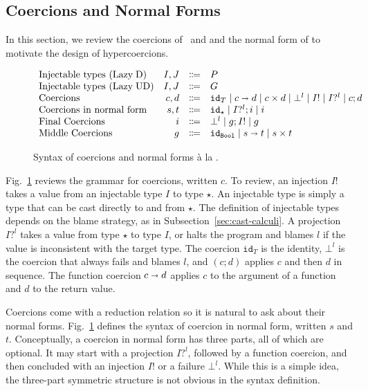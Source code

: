 \documentclass[runningheads]{llncs}
\newcommand{\stxrule}[3]{\text{#2} & #1 & \Coloneqq & #3\\}
\newcommand{\figref}[1]{Fig.~\ref{#1}}
\newcommand{\LUD}{\ensuremath{\text{Lazy\;UD}}}
\newcommand{\LD}{\ensuremath{\text{Lazy\;D}}}
\newcommand{\Tdyn}[0]{\ensuremath{\star}}
\newcommand{\Pbool}[0]{\ensuremath{\mathtt{Bool}}}
\newcommand{\Pfunc}[2]{\ensuremath{#1 \shortrightarrow #2}}
\newcommand{\Pprod}[2]{\ensuremath{#1 \times #2}}
\newcommand{\cnfproj}[2]{#1?^{#2}}
\newcommand{\cnfinj}[1]{#1!}
\newcommand{\cnfseq}[2]{#1;#2}
\newcommand{\cnffail}[1]{\bot^{#1}}
\newcommand{\cnffunc}[2]{\Pfunc{#1}{#2}}
\newcommand{\cnfprod}[2]{\Pprod{#1}{#2}}
\newcommand{\cnfid}[1]{\ensuremath{\mathtt{id}_{#1}}}
\begin{document}
\subsection{Coercions and Normal Forms} 
\label{sec:coercions}

In this section, we review the coercions
of~\citet{henglein1994dynamic} and \citet{herman2010space} and the
normal form of \citet{siek2012interpretations} to motivate the design
of hypercoercions.

\begin{figure}[tp]
	\[
	\begin{array}{lrcl}
	\stxrule{I,J}{Injectable types (\LD)}{P}
	\stxrule{I,J}{Injectable types (\LUD)}{G}
	\stxrule{c,d}{Coercions}{
		\cnfid{T}       \mid
		\cnffunc{c}{d}  \mid
		\cnfprod{c}{d}  \mid
		\cnffail{l}     \mid
		\cnfinj{I}      \mid
		\cnfproj{I}{l}  \mid
		\cnfseq{c}{d}
	}
	\stxrule{s,t}{Coercions in normal form}{
		\cnfid{\Tdyn}       \mid
		\cnfseq{\cnfproj{I}{l}}{i} \mid
		i
	}
	\stxrule{i}{Final Coercions}{
		\cnffail{l} \mid
		\cnfseq{g}{\cnfinj{I}} \mid
		g
	}
	\stxrule{g}{Middle Coercions}{
		\cnfid{\Pbool} \mid
		\cnffunc{s}{t} \mid
		\cnfprod{s}{t}
	}
	\end{array}
	\]
	\caption{Syntax of coercions and normal forms {\`a} la 
		\citet{siek2012interpretations}.}
	\label{fig:normal-coercion}
\end{figure}

\figref{fig:normal-coercion} reviews the grammar for coercions,
written $c$.
%
To review, an injection $\cnfinj{I}$ takes a value from an injectable type
$I$ to type $\Tdyn$. An injectable type is simply a type that can be
cast directly to and from $\Tdyn$. The
definition of injectable types depends on the blame strategy, as in 
Subsection~\ref{sec:cast-calculi}.
%
A projection $I?^l$ takes a value from type $\Tdyn$ to type $I$, or
halts the program and blames $l$ if the value is inconsistent with 
the target type.
The coercion \cnfid{T} is the identity, $\bot^{l}$ is the coercion that
always fails and blames $l$, and $(\cnfseq{c}{d})$ applies $c$ and
then $d$ in sequence. The function coercion $\cnffunc{c}{d}$
applies $c$ to the argument of a function and $d$ to the return
value.

Coercions come with a reduction relation so it is natural to ask about
their normal forms. \figref{fig:normal-coercion} defines the syntax of
coercion in normal form, written $s$ and $t$.  Conceptually, a
coercion in normal form has three parts, all of which are optional.
It may start with a projection $I?^l$, followed by a function
coercion, and then concluded with an injection $I!$ or a failure
$\bot^l$. While this is a simple idea, the three-part symmetric
structure is not obvious in the syntax definition.
\end{document}
